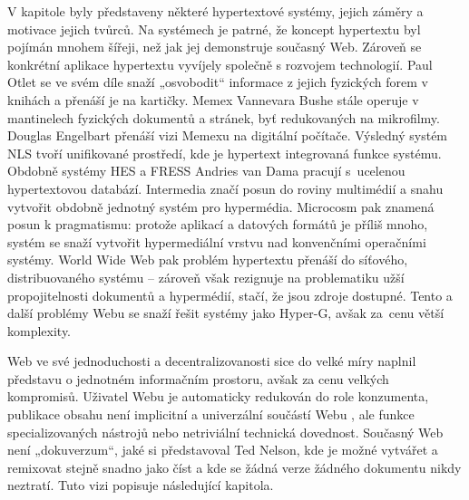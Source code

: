 V kapitole byly představeny některé hypertextové systémy, jejich záměry a motivace jejich tvůrců. Na systémech je patrné, že koncept hypertextu byl pojímán mnohem šířeji, než jak jej demonstruje současný Web. Zároveň se konkrétní aplikace hypertextu vyvíjely společně s rozvojem technologií. Paul Otlet se ve svém díle snaží „osvobodit“ informace z jejich fyzických forem v knihách a přenáší je na kartičky. Memex Vannevara Bushe stále operuje v mantinelech fyzických dokumentů a stránek, byť redukovaných na mikrofilmy. Douglas Engelbart přenáší vizi Memexu na digitální počítače. Výsledný systém NLS tvoří unifikované prostředí, kde je hypertext integrovaná funkce systému. Obdobně systémy HES a FRESS Andries van Dama pracují s~ucelenou hypertextovou databází. Intermedia značí posun do roviny multimédií a snahu vytvořit obdobně jednotný systém pro hypermédia. Microcosm pak znamená posun k pragmatismu: protože aplikací a datových formátů je příliš mnoho, systém se snaží vytvořit hypermediální vrstvu nad konvenčními operačními systémy. World Wide Web pak problém hypertextu přenáší do síťového, distribuovaného systému -- zároveň však rezignuje na problematiku užší propojitelnosti dokumentů a hypermédií, stačí, že jsou zdroje dostupné. Tento a další problémy Webu se snaží řešit systémy jako Hyper-G, avšak za~cenu větší komplexity.

Web ve své jednoduchosti a decentralizovanosti sice do velké míry naplnil představu o jednotném informačním prostoru, avšak za cenu velkých kompromisů. Uživatel Webu je automaticky redukován do role konzumenta, publikace obsahu není implicitní a univerzální součástí Webu \autocite[220]{Glut}, ale funkce specializovaných nástrojů nebo netriviální technická dovednost. Současný Web není „dokuverzum“, jaké si představoval Ted Nelson, kde je možné vytvářet a remixovat stejně snadno jako číst a kde se žádná verze žádného dokumentu nikdy neztratí. Tuto vizi popisuje následující kapitola.

